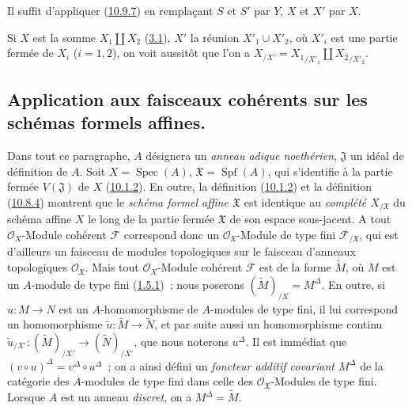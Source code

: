 Il suffit d'appliquer (\hyperref[I.10.9.7-fr]{10.9.7}) en remplaçant
$S$ et $S'$ par $Y$, $X$ et $X'$ par $X$.

\begin{remark}[10.9.10]
\label{I.10.9.10-fr}
Si $X$ est la somme $X_1\amalg X_2$
(\hyperref[subsection:I.3.1-fr]{3.1}), $X'$ la réunion
$X'_1\cup X'_2$, où $X'_i$ est une partie fermée de $X_i$ ($i=1,2$),
on voit aussitôt que l'on a
$X_{/X'}={X_1}_{/X'_1}\amalg {X_2}_{/X'_2}$.
\end{remark}

\subsection{Application aux faisceaux cohérents sur les schémas formels
affines.}
\label{subsection:I.10.10-fr}

\begin{env}[10.10.1]
\label{I.10.10.1-fr}
Dans tout ce paragraphe, $A$ désignera un \emph{anneau adique
noethérien}, $\mathfrak{J}$ un idéal de définition de $A$. Soit
$X=\operatorname{Spec}(A)$, $\mathfrak{X}=\operatorname{Spf}(A)$, qui
s'identifie à la partie fermée $V(\mathfrak{J})$ de $X$
(\hyperref[I.10.1.2-fr]{10.1.2}). En outre, la définition
(\hyperref[I.10.1.2-fr]{10.1.2}) et la définition
(\hyperref[I.10.8.4-fr]{10.8.4}) montrent que le
\emph{schéma formel affine $\mathfrak{X}$} est identique au
\emph{complété $X_{/\mathfrak{X}}$} du schéma affine $X$ le long de la
partie fermée $\mathfrak{X}$ de son espace sous-jacent. A tout
$\mathscr{O}_X$-Module cohérent $\mathscr{F}$ correspond donc un
$\mathscr{O}_{\mathfrak{X}}$-Module de type fini
$\mathscr{F}_{/\mathfrak{X}}$, qui est d'ailleurs un faisceau de modules
topologiques sur le faisceau d'anneaux topologiques
$\mathscr{O}_{\mathfrak{X}}$. Mais tout $\mathscr{O}_X$-Module cohérent
$\mathscr{F}$ est de la forme $\widetilde M$, où $M$ est un $A$-module
de type fini (\hyperref[I.1.5.1-fr]{1.5.1})~; nous poserons
$(\widetilde M)_{/X}=M^\Delta$. En outre, si $u:M\to N$ est
un $A$-homomorphisme de $A$-modules de type fini, il lui correspond un
homomorphisme $\widetilde u:\widetilde M\to\widetilde N$, et par suite
aussi un homomorphisme continu
$\widetilde u_{/X'}:(\widetilde M)_{/X'}\to
(\widetilde N)_{/X'}$, que nous noterons $u^\Delta$. Il est
immédiat que
$(v\circ u)^\Delta=v^\Delta\circ u^\Delta$~; on a ainsi défini un
\emph{foncteur additif covariant $M^\Delta$} de la catégorie des
$A$-modules de type fini dans celle des
$\mathscr{O}_{\mathfrak{X}}$-Modules de type fini. Lorsque $A$ est un
anneau \emph{discret}, on a $M^\Delta=\widetilde M$.
\end{env}

